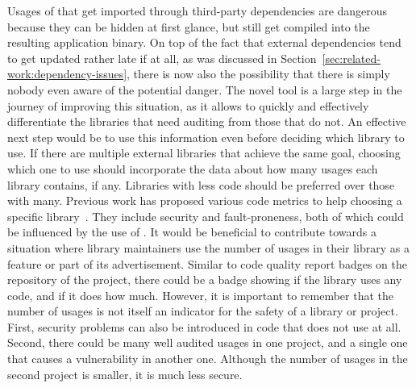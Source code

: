 Usages of \unsafe{} that get imported through third-party dependencies are dangerous because they can be hidden at first
glance, but still get compiled into the resulting application binary.
On top of the fact that external dependencies tend to get updated rather late if at all, as was discussed in
Section~\ref{sec:related-work:dependency-issues}, there is now also the possibility that there is simply nobody even
aware of the potential danger.
The novel tool \toolGeiger{} is a large step in the journey of improving this situation, as it allows to quickly and
effectively differentiate the libraries that need auditing from those that do not.
An effective next step would be to use this information even before deciding which library to use.
If there are multiple external libraries that achieve the same goal, choosing which one to use should incorporate the
data about how many \unsafe{} usages each library contains, if any.
Libraries with less \unsafe{} code should be preferred over those with many.
Previous work has proposed various code metrics to help choosing a specific library~\cite{delamora2018}.
They include security and fault-proneness, both of which could be influenced by the use of \unsafe{}.
It would be beneficial to contribute towards a situation where library maintainers use the number of \unsafe{} usages
in their library as a feature or part of its advertisement.
Similar to code quality report badges on the \github{} repository of the project, there could be a badge showing if the
library uses any \unsafe{} code, and if it does how much.
However, it is important to remember that the number of \unsafe{} usages is not itself an indicator for the safety of
a library or project.
First, security problems can also be introduced in code that does not use \unsafe{} at all.
Second, there could be many well audited \unsafe{} usages in one project, and a single one that causes a vulnerability
in another one.
Although the number of \unsafe{} usages in the second project is smaller, it is much less secure.

